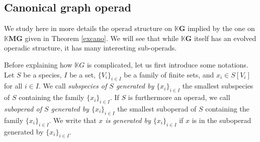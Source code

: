 \documentclass[a4paper]{article}
\theoremstyle{definition}
\newtheorem{example}[definition]{Example}
\newcommand{\K}{\mathbb{K}}
\newcommand{\MG}{\mathbf{MG}}
\newcommand{\G}{\mathbf{G}}
\begin{document}
\subsection{Canonical graph operad}
We study here in more details the operad structure on $\K \G$ implied by the one 
on $\K \MG$ given in Theorem \ref{excano}. 
We will see that while $\K \G$ itself has an 
 evolved operadic structure, it has many interesting sub-operads.

Before explaining how $\K G$ is complicated, let us first introduce some notations.
Let $S$ be a species, $I$ be a set, $\{V_i\}_{i\in I}$ be a family of finite sets, and
$x_i\in S[V_i]$ for all $i\in I$. We call {\em subspecies of $S$ generated by $\{x_i\}_{i\in I}$}
the smallest subspecies of $S$ containing the family $\{x_i\}_{i\in I}$.
If $S$ is furthermore an operad, we call {\em suboperad of $S$ generated by $\{x_i\}_{i\in I}$}
the smallest suboperad of $S$ containing the family $\{x_i\}_{i\in I}$. We write that {\em $x$ is
generated by $\{x_i\}_{i\in I}$} if $x$ is in the suboperad generated by $\{x_i\}_{i\in I}$.

\end{document}

